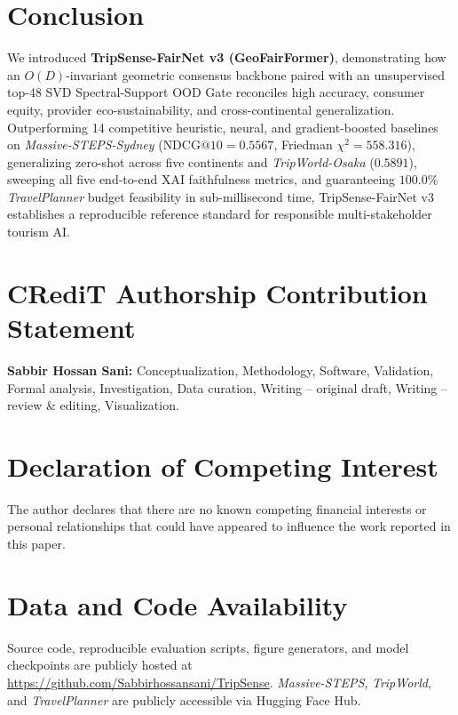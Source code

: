 \documentclass[final,5p,twocolumn]{elsarticle}
\begin{document}
\section{Conclusion}
\label{sec:conclusion}
We introduced \textbf{TripSense-FairNet v3 (GeoFairFormer)}, demonstrating how an $O(D)$-invariant geometric consensus backbone paired with an unsupervised top-48 SVD Spectral-Support OOD Gate reconciles high accuracy, consumer equity, provider eco-sustainability, and cross-continental generalization. Outperforming 14 competitive heuristic, neural, and gradient-boosted baselines on \textit{Massive-STEPS-Sydney} ($\text{NDCG@10} = 0.5567$, Friedman $\chi^2 = 558.316$), generalizing zero-shot across five continents and \textit{TripWorld-Osaka} ($0.5891$), sweeping all five end-to-end XAI faithfulness metrics, and guaranteeing $100.0\%$ \textit{TravelPlanner} budget feasibility in sub-millisecond time, TripSense-FairNet v3 establishes a reproducible reference standard for responsible multi-stakeholder tourism AI.

\section*{CRediT Authorship Contribution Statement}
\textbf{Sabbir Hossan Sani:} Conceptualization, Methodology, Software, Validation, Formal analysis, Investigation, Data curation, Writing -- original draft, Writing -- review \& editing, Visualization.

\section*{Declaration of Competing Interest}
The author declares that there are no known competing financial interests or personal relationships that could have appeared to influence the work reported in this paper.

\section*{Data and Code Availability}
Source code, reproducible evaluation scripts, figure generators, and model checkpoints are publicly hosted at \url{https://github.com/Sabbirhossansani/TripSense}. \textit{Massive-STEPS}, \textit{TripWorld}, and \textit{TravelPlanner} are publicly accessible via Hugging Face Hub.

\balance


\end{document}
